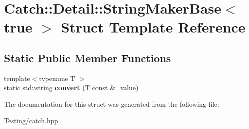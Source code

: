\hypertarget{struct_catch_1_1_detail_1_1_string_maker_base_3_01true_01_4}{\section{Catch\-:\-:Detail\-:\-:String\-Maker\-Base$<$ true $>$ Struct Template Reference}
\label{struct_catch_1_1_detail_1_1_string_maker_base_3_01true_01_4}
}
\subsection*{Static Public Member Functions}
\begin{DoxyCompactItemize}
\item 
\hypertarget{struct_catch_1_1_detail_1_1_string_maker_base_3_01true_01_4_af9b5fdf7fddd8c5c873caa819e5f00f6}{{\footnotesize template$<$typename T $>$ }\\static std\-::string {\bfseries convert} (T const \&\-\_\-value)}\label{struct_catch_1_1_detail_1_1_string_maker_base_3_01true_01_4_af9b5fdf7fddd8c5c873caa819e5f00f6}

\end{DoxyCompactItemize}


The documentation for this struct was generated from the following file\-:\begin{DoxyCompactItemize}
\item 
Testing/catch.\-hpp\end{DoxyCompactItemize}
